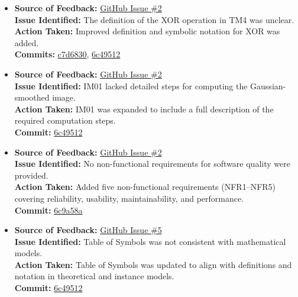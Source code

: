 \documentclass{article}
\begin{document}
\begin{itemize}
  \item \textbf{Source of Feedback:} \href{https://github.com/KiranSingh15/CAS-741-Image-Correspondences/issues/2}{GitHub Issue \#2} \\
  \textbf{Issue Identified:} The definition of the XOR operation in TM4 was unclear. \\
  \textbf{Action Taken:} Improved definition and symbolic notation for XOR was added. \\
  \textbf{Commits:} 
    \href{https://github.com/KiranSingh15/CAS-741-Image-Correspondences/commit/c7d683086b2546cf4bc67b98c30fa94f611fccd6}{c7d6830}, 
    \href{https://github.com/KiranSingh15/CAS-741-Image-Correspondences/commit/6c49512d687fb1ed972857dcae2e2e3c98af7696}{6c49512}

  \item \textbf{Source of Feedback:} \href{https://github.com/KiranSingh15/CAS-741-Image-Correspondences/issues/2}{GitHub Issue \#2} \\
  \textbf{Issue Identified:} IM01 lacked detailed steps for computing the Gaussian-smoothed image. \\
  \textbf{Action Taken:} IM01 was expanded to include a full description of the required computation steps. \\
  \textbf{Commit:} \href{https://github.com/KiranSingh15/CAS-741-Image-Correspondences/commit/6c49512d687fb1ed972857dcae2e2e3c98af7696}{6c49512}

  \item \textbf{Source of Feedback:} \href{https://github.com/KiranSingh15/CAS-741-Image-Correspondences/issues/2}{GitHub Issue \#2} \\
  \textbf{Issue Identified:} No non-functional requirements for software quality were provided. \\
  \textbf{Action Taken:} Added five non-functional requirements (NFR1–NFR5) covering reliability, usability, maintainability, and performance. \\
  \textbf{Commit:} \href{https://github.com/KiranSingh15/CAS-741-Image-Correspondences/commit/6c9a58a3ec39ec8de9118ef73d7c17ca66b56e96}{6c9a58a}

  \item \textbf{Source of Feedback:} \href{https://github.com/KiranSingh15/CAS-741-Image-Correspondences/issues/5}{GitHub Issue \#5} \\
  \textbf{Issue Identified:} Table of Symbols was not consistent with mathematical models. \\
  \textbf{Action Taken:} Table of Symbols was updated to align with definitions and notation in theoretical and instance models. \\
  \textbf{Commit:} \href{https://github.com/KiranSingh15/CAS-741-Image-Correspondences/commit/6c49512d687fb1ed972857dcae2e2e3c98af7696}{6c49512}

\end{itemize}
\end{document}
